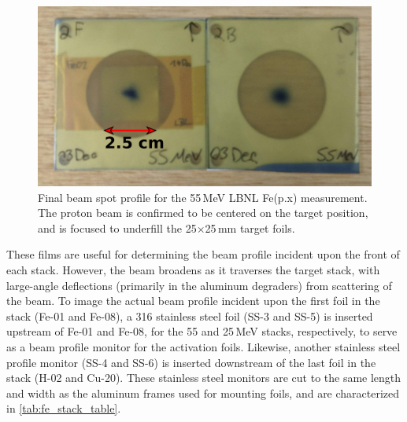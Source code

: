 \begin{figure}
 \centering
 \includegraphics[width=0.75\columnwidth]{./figures/55MeV_optics_films.png}
 \caption{Final beam spot profile for the 55\,MeV LBNL Fe(p.x) measurement. The  proton beam is confirmed to be centered on the target position, and is focused to underfill the 25$\times$25\,mm target foils.}
 \label{fig:fe55_preexp_beam_spot}
\end{figure}





These films are useful for determining the beam profile incident upon the front of each stack.
However, the beam broadens as it traverses the target stack, with large-angle deflections (primarily in the aluminum degraders) from scattering of the beam.
To image the actual beam profile incident upon the first foil in the stack (Fe-01 and Fe-08), a 316 stainless steel foil (SS-3 and SS-5) is inserted upstream of Fe-01 and Fe-08, for the 55 and 25\,MeV stacks, respectively, to serve as a beam profile monitor for the activation foils.
Likewise, another stainless steel profile monitor (SS-4 and SS-6) is inserted downstream of the last foil in the stack (H-02 and Cu-20).
These stainless steel monitors are cut to the same length and width as the aluminum frames used for mounting foils, and are characterized in \autoref{tab:fe_stack_table}.





